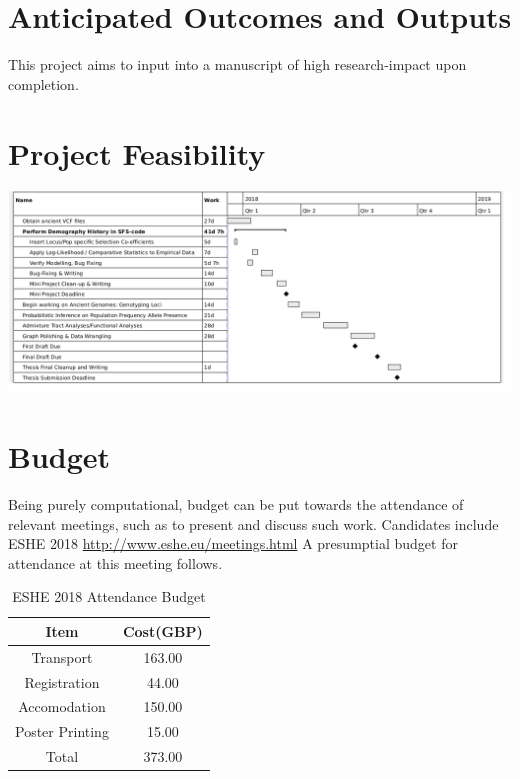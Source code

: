 \documentclass[11pt, a4paper]{article}
\begin{document}
	\section{Anticipated Outcomes and Outputs}
	This project aims to input into a manuscript of high research-impact upon completion. 
	
	
	
	\section{Project Feasibility}
	
	
	\includegraphics[scale=1.5]{Gantt.png} 



	\section{Budget}

Being purely computational, budget can be put towards the attendance of relevant meetings, such as to present and discuss such work. Candidates include ESHE 2018  \url{http://www.eshe.eu/meetings.html} A presumptial budget for attendance at this meeting follows. 

\begin{table}[ht]
\caption{ESHE 2018 Attendance Budget}
\centering
\begin{tabular}{c c}
\hline
Item & Cost(GBP) \\ [0.5ex]
\hline
Transport & 163.00			\\
Registration & 44.00	\\
Accomodation & 150.00	\\
Poster Printing & 15.00 \\
\hline
Total & 373.00			\\ [1ex]
\hline
\end{tabular}
\end{table}

\pagebreak



\end{document}
